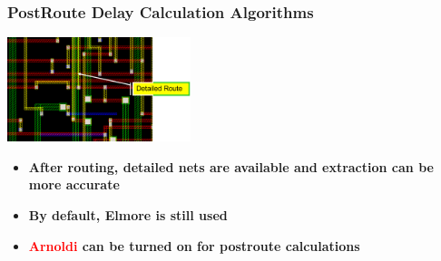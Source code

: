 \documentclass[compress]{beamer}
\begin{document}
\begin{frame}
	\frametitle{PostRoute Delay Calculation Algorithms}
	\begin{center}
		\includegraphics[width=0.4\textwidth]{Arnoldi}
	\end{center}
	\begin{itemize}
		\item \textbf{After routing, detailed nets are available and extraction can be more accurate}
		\item \textbf{By default, Elmore is still used}
		\item \textbf{\textcolor{red}{Arnoldi} can be turned on for postroute calculations}
		
	\end{itemize}	
\end{frame}

\end{document}
